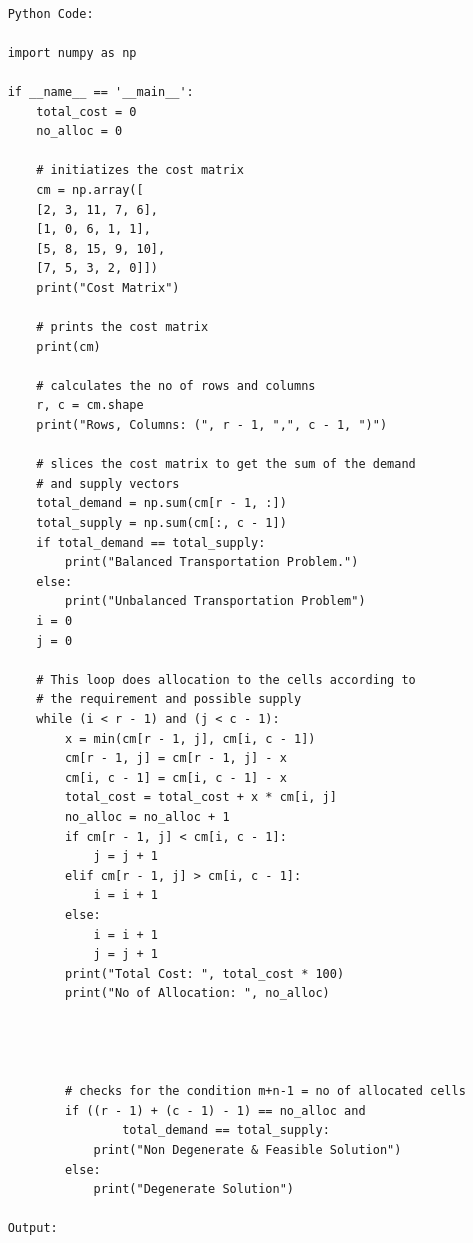 \documentclass[12pt, letterpaper, twoside]{book}
\begin{document}
\begin{lstlisting}

	Python Code:
	
	import numpy as np
	
	if __name__ == '__main__':
		total_cost = 0
		no_alloc = 0
		
		# initiatizes the cost matrix
		cm = np.array([
		[2, 3, 11, 7, 6], 
		[1, 0, 6, 1, 1], 
		[5, 8, 15, 9, 10], 
		[7, 5, 3, 2, 0]])
		print("Cost Matrix")
		
		# prints the cost matrix
		print(cm)
		
		# calculates the no of rows and columns
		r, c = cm.shape
		print("Rows, Columns: (", r - 1, ",", c - 1, ")")
		
		# slices the cost matrix to get the sum of the demand 
		# and supply vectors
		total_demand = np.sum(cm[r - 1, :])
		total_supply = np.sum(cm[:, c - 1])
		if total_demand == total_supply:
			print("Balanced Transportation Problem.")
		else:
			print("Unbalanced Transportation Problem")
		i = 0
		j = 0
		
		# This loop does allocation to the cells according to
		# the requirement and possible supply
		while (i < r - 1) and (j < c - 1):
			x = min(cm[r - 1, j], cm[i, c - 1])
			cm[r - 1, j] = cm[r - 1, j] - x
			cm[i, c - 1] = cm[i, c - 1] - x
			total_cost = total_cost + x * cm[i, j]
			no_alloc = no_alloc + 1
			if cm[r - 1, j] < cm[i, c - 1]:
				j = j + 1
			elif cm[r - 1, j] > cm[i, c - 1]:
				i = i + 1
			else:
				i = i + 1
				j = j + 1
			print("Total Cost: ", total_cost * 100)
			print("No of Allocation: ", no_alloc)
			
			
			
			
			# checks for the condition m+n-1 = no of allocated cells
			if ((r - 1) + (c - 1) - 1) == no_alloc and 
					total_demand == total_supply:
				print("Non Degenerate & Feasible Solution")
			else:
				print("Degenerate Solution")
	
	Output:

\end{lstlisting}
\end{document}
